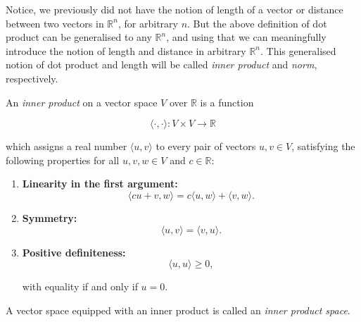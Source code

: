 Notice, we previously did not have the notion of length of a vector or distance between two vectors in \( \mathbb{R}^n \), for arbitrary \( n \). But the above definition of dot product can be generalised to any  \( \mathbb{R}^n \), and using that we can meaningfully introduce the notion of length and distance in arbitrary \( \mathbb{R}^n \). This generalised notion of dot product and length will be called \emph{inner product} and \emph{norm}, respectively.

\begin{definition}
	An \emph{inner product} on a vector space \(V\) over \(\mathbb{R}\) is a function

	\begin{equation}
		\langle \cdot,\cdot \rangle : V \times V \longrightarrow \mathbb{R}
		\label{eq:inner-product-1}
	\end{equation}

	which assigns a real number \(\langle u,v\rangle\) to every pair of vectors
	\(u,v\in V\), satisfying the following properties for all
	\(u,v,w\in V\) and \(c\in\mathbb{R}\):

	\begin{enumerate}
		\item \textbf{Linearity in the first argument:}
		      \begin{equation}
			      \langle cu+v,w\rangle
			      =
			      c\langle u,w\rangle+\langle v,w\rangle .
			      \label{eq:inner-product-2}
		      \end{equation}

		\item \textbf{Symmetry:}
		      \begin{equation}
			      \langle u,v\rangle=\langle v,u\rangle .
			      \label{eq:inner-product-3}
		      \end{equation}

		\item \textbf{Positive definiteness:}
		      \begin{equation}
			      \langle u,u\rangle\geq 0,
			      \label{eq:inner-product-4}
		      \end{equation}

		      with equality if and only if \(u=0\).
	\end{enumerate}

	A vector space equipped with an inner product is called an
	\emph{inner product space}.
\end{definition}


